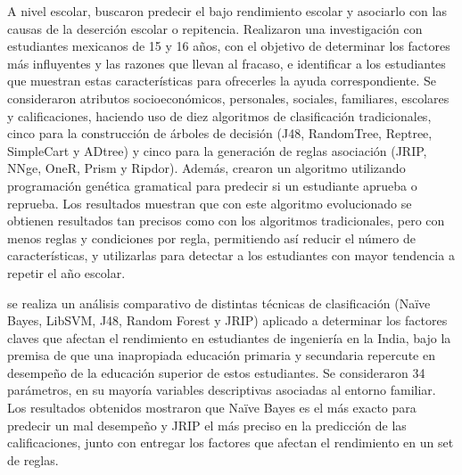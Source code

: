 A nivel escolar, \textcite{marquez2013predicting} buscaron predecir el bajo rendimiento escolar y asociarlo con las causas de la deserción escolar o repitencia. Realizaron una investigación con estudiantes mexicanos de 15 y 16 años, con el objetivo de determinar los factores más influyentes y las razones que llevan al fracaso, e identificar a los estudiantes que muestran estas características para ofrecerles la ayuda correspondiente. Se consideraron atributos socioeconómicos, personales, sociales, familiares, escolares y calificaciones, haciendo uso de diez algoritmos de clasificación tradicionales, cinco para la construcción de árboles de decisión (J48, RandomTree, Reptree, SimpleCart y ADtree) y cinco para la generación de reglas asociación (JRIP, NNge, OneR, Prism y Ripdor). Además, crearon un algoritmo utilizando programación genética gramatical para predecir si un estudiante aprueba o reprueba. Los resultados muestran que con este algoritmo evolucionado se obtienen resultados tan precisos como con los algoritmos tradicionales, pero con menos reglas y condiciones por regla, permitiendo así reducir el número de características, y utilizarlas para detectar a los estudiantes con mayor tendencia a repetir el año escolar.

\textcite{shamsi2016comparative} se realiza un análisis comparativo de distintas técnicas de clasificación (Na\"ive Bayes, LibSVM, J48, Random Forest y JRIP) aplicado a determinar los factores claves que afectan el rendimiento en estudiantes de ingeniería en la India, bajo la premisa de que una inapropiada educación primaria y secundaria repercute en desempeño de la educación superior de estos estudiantes. Se consideraron 34 parámetros, en su mayoría variables descriptivas asociadas al entorno familiar. Los resultados obtenidos mostraron que Na\"ive Bayes es el más exacto para predecir un mal desempeño y JRIP el más preciso en la predicción de las calificaciones, junto con entregar los factores que afectan el rendimiento en un set de reglas.





